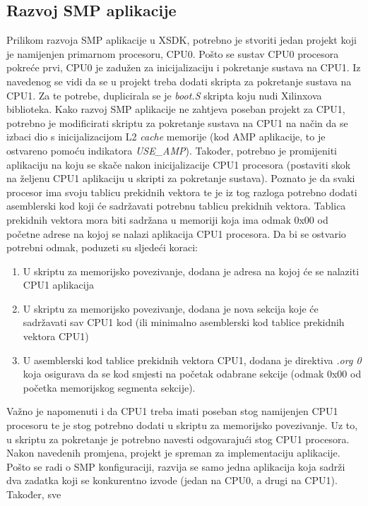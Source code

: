 \documentclass[times, utf8, diplomski, numeric]{fer}
\begin{document}
\subsection{Razvoj SMP aplikacije}
Prilikom razvoja SMP aplikacije u XSDK, potrebno je stvoriti jedan projekt koji je namijenjen primarnom procesoru, CPU0.
Pošto se sustav CPU0 procesora pokreće prvi, CPU0 je zadužen za inicijalizaciju i pokretanje sustava na CPU1. Iz navedenog
se vidi da se u projekt treba dodati skripta za pokretanje sustava na CPU1. Za te potrebe, duplicirala se je \textit{boot.S} skripta
koju nudi Xilinxova biblioteka. Kako razvoj SMP aplikacije ne zahtjeva poseban projekt za CPU1, potrebno je modificirati
skriptu za pokretanje sustava na CPU1 na način da se izbaci dio s inicijalizacijom L2 \textit{cache} memorije (kod AMP
aplikacije, to je ostvareno pomoću indikatora \textit{USE\_AMP}). Također, potrebno je promijeniti aplikaciju na koju se skače
nakon inicijalizacije CPU1 procesora (postaviti skok na željenu CPU1 aplikaciju u skripti za pokretanje sustava).
Poznato je da svaki procesor ima svoju tablicu
prekidnih vektora te je iz tog razloga potrebno dodati asemblerski kod koji će sadržavati potrebnu tablicu prekidnih vektora.
Tablica prekidnih vektora mora biti sadržana u memoriji koja ima odmak 0x00 od početne adrese na kojoj se nalazi
aplikacija CPU1 procesora. Da bi se ostvario potrebni odmak, poduzeti su sljedeći koraci:
\begin{enumerate}
  \item{U skriptu za memorijsko povezivanje, dodana je adresa na kojoj će se nalaziti CPU1 aplikacija}
  \item{U skriptu za memorijsko povezivanje, dodana je nova sekcija koje će sadržavati sav CPU1 kod (ili minimalno asemblerski
  kod tablice prekidnih vektora CPU1)}
  \item{U asemblerski kod tablice prekidnih vektora CPU1, dodana je direktiva \textit{.org 0} koja osigurava da se kod smjesti
  na početak odabrane sekcije (odmak 0x00 od početka memorijskog segmenta sekcije).}
\end{enumerate}
Važno je napomenuti i da CPU1 treba imati poseban stog namijenjen CPU1 procesoru te je stog potrebno dodati u skriptu za
memorijsko povezivanje. Uz to, u skriptu za pokretanje je potrebno navesti odgovarajući stog CPU1 procesora.
Nakon navedenih promjena, projekt je spreman za implementaciju aplikacije. Pošto se radi o SMP konfiguraciji, razvija se
samo jedna aplikacija koja sadrži dva zadatka koji se konkurentno izvode (jedan na CPU0, a drugi na CPU1). Također, sve
\end{document}
